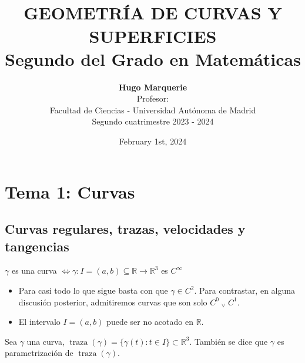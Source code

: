 \documentclass[12pt]{article}
\title{ \normalsize
		\HRule{0.06cm} \\ [0.5cm] %
		\LARGE \textbf{\uppercase{Geometría de curvas y superficies}
		\HRule{0.06cm} \\ \LARGE{Segundo del Grado en Matemáticas} \vspace*{10\baselineskip}}
		}
\date{February 1st, 2024}
\author{\textbf{Hugo Marquerie} \\ 
		Profesor: \\
		Facultad de Ciencias - Universidad Autónoma de Madrid \\
		Segundo cuatrimestre 2023 - 2024}
\theoremstyle{plain}
\newcommand{\R}{\mathbb{R}}
\newcommand{\appl}[3]{#1 \colon #2 \longrightarrow #3}
\newcommand{\ve}{\; _{\vee} \;}
\newcommand{\trz}[1]{\operatorname{traza}\left(#1\right)}
\begin{document}
\onehalfspacing
\setlength{\abovedisplayskip}{0.15cm}
\setlength{\belowdisplayskip}{0.25cm}
  
\maketitle
\thispagestyle{empty}
\clearpage
{} 

\section{Tema 1: Curvas}

\subsection{Curvas regulares, trazas, velocidades y tangencias}
\begin{defn}[Curva]
	$\gamma$ es una curva $\iff \appl{\gamma}{I=(a,b)\subseteq\R}{\R^3}$ es $C^{\infty}$
	\begin{itemize}
		\item Para casi todo lo que sigue basta con que $\gamma \in C^2$. Para contrastar, en alguna discusión posterior, admitiremos curvas que son solo $C^0 \ve C^1$.
		\item El intervalo $I = (a,b)$ puede ser no acotado en $\R$.
	\end{itemize}
\end{defn}
\begin{defn}[Traza]
	Sea $\gamma$ una curva, $\trz{\gamma}=\{\gamma(t):t\in I\}\subset \R^3$. También se dice que $\gamma$ es parametrización de $\trz{\gamma}$.
\end{defn}
\end{document}
